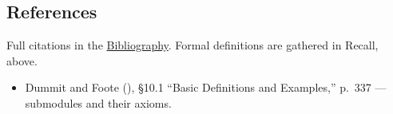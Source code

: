 \subsection{References}\label{sec:10-modules:04-submodules:3}

Full citations in the \hyperref[sec:root:bibliography:1]{Bibliography}. Formal definitions are gathered in Recall, above.

\begin{itemize}
\tightlist
\item
  Dummit and Foote (\cite{DummitFoote2003}), \S10.1 ``Basic Definitions and Examples,'' p.~337 --- submodules and their axioms.
\end{itemize}
